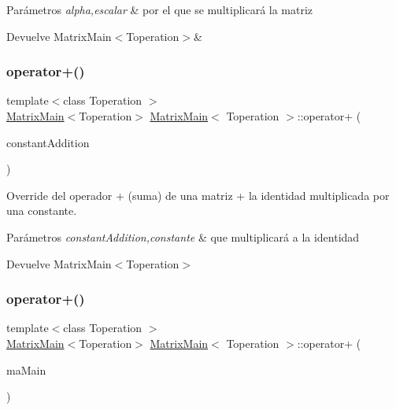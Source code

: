 \begin{DoxyParams}{Parámetros}
{\em alpha,escalar} & por el que se multiplicará la matriz \\
\hline
\end{DoxyParams}
\begin{DoxyReturn}{Devuelve}
Matrix\+Main$<$\+Toperation$>$\& 
\end{DoxyReturn}
\mbox{\label{classMatrixMain_a0c1bc3c2ee26975fe979213d9d177608}} 
\subsubsection{\texorpdfstring{operator+()}{operator+()}\hspace{0.1cm}{\footnotesize\ttfamily [1/2]}}
{\footnotesize\ttfamily template$<$class Toperation $>$ \\
\hyperlink{classMatrixMain}{Matrix\+Main}$<$Toperation$>$ \hyperlink{classMatrixMain}{Matrix\+Main}$<$ Toperation $>$\+::operator+ (\begin{DoxyParamCaption}\item[{const Toperation \&}]{constant\+Addition }\end{DoxyParamCaption})}



Override del operador + (suma) de una matriz + la identidad multiplicada por una constante. 


\begin{DoxyParams}{Parámetros}
{\em constant\+Addition,constante} & que multiplicará a la identidad \\
\hline
\end{DoxyParams}
\begin{DoxyReturn}{Devuelve}
Matrix\+Main$<$\+Toperation$>$ 
\end{DoxyReturn}
\mbox{\label{classMatrixMain_a16c27bc4800c921cc22ad5aa3c159b11}} 
\subsubsection{\texorpdfstring{operator+()}{operator+()}\hspace{0.1cm}{\footnotesize\ttfamily [2/2]}}
{\footnotesize\ttfamily template$<$class Toperation $>$ \\
\hyperlink{classMatrixMain}{Matrix\+Main}$<$Toperation$>$ \hyperlink{classMatrixMain}{Matrix\+Main}$<$ Toperation $>$\+::operator+ (\begin{DoxyParamCaption}\item[{\hyperlink{classMatrixMain}{Matrix\+Main}$<$ Toperation $>$ \&}]{ma\+Main }\end{DoxyParamCaption})}



